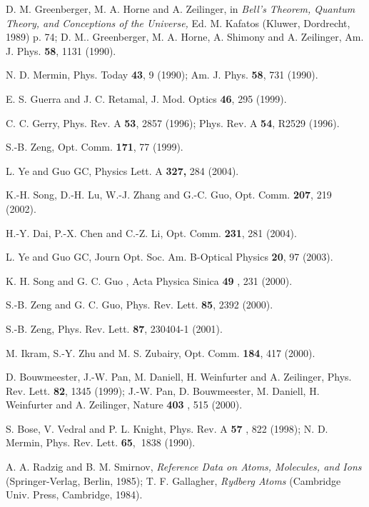 \documentclass[12pt,thmsa]{article}
\begin{document}
\begin{thebibliography}{99}
 D. M. Greenberger, M. A. Horne and A. Zeilinger, in \textit{%
Bell's Theorem, Quantum Theory, and Conceptions of the Universe, }Ed. M.
Kafatos (Kluwer, Dordrecht, 1989) p. 74; D. M.. Greenberger, M. A. Horne, A.
Shimony and A. Zeilinger, Am. J. Phys. \textbf{58}, 1131 (1990).

 N. D. Mermin, Phys. Today \textbf{43}, 9 (1990); Am. J.
Phys. \textbf{58}, 731 (1990).

 E. S. Guerra and J. C. Retamal, J. Mod. Optics \textbf{%
46}, 295 (1999).

 C. C. Gerry, Phys. Rev. A \textbf{53}, 2857 (1996); Phys.
Rev. A \textbf{54}, R2529 (1996).

 S.-B. Zeng, Opt. Comm. \textbf{171}, 77 (1999).

 L. Ye and Guo GC, Physics Lett. A \textbf{327,} 284 (2004).

 K.-H. Song, D.-H. Lu, W.-J. Zhang and G.-C. Guo,
Opt. Comm. \textbf{207}, 219 (2002).

 H.-Y. Dai, P.-X. Chen and C.-Z. Li, Opt. Comm. \textbf{%
231}, 281 (2004).

 L. Ye and Guo GC, Journ Opt. Soc. Am. B-Optical Physics 
\textbf{20}, 97 (2003).

 K. H. Song and G. C. Guo , Acta Physica Sinica \textbf{49}%
, 231 (2000).

 S.-B. Zeng and G. C. Guo, Phys. Rev. Lett. \textbf{85},
2392 (2000).

 S.-B. Zeng, Phys. Rev. Lett. \textbf{87}, 230404-1 (2001).

 M. Ikram, S.-Y. Zhu and M. S. Zubairy, Opt. Comm. 
\textbf{184}, 417 (2000).

 D. Bouwmeester, J.-W. Pan, M. Daniell, H. Weinfurter and A.
Zeilinger, Phys. Rev. Lett. \textbf{82}, 1345 (1999); J.-W. Pan, D.
Bouwmeester, M. Daniell, H. Weinfurter and A. Zeilinger, Nature \textbf{403}%
, 515 (2000).

 S. Bose, V. Vedral and P. L. Knight, Phys. Rev. A \textbf{57}%
, 822 (1998); N. D. Mermin, Phys. Rev. Lett. \textbf{65},\textbf{\ }1838
(1990).

 A. A. Radzig and B. M. Smirnov, \textit{Reference Data on
Atoms, Molecules, and Ions} (Springer-Verlag, Berlin, 1985); T. F.
Gallagher, \textit{Rydberg Atoms }(Cambridge Univ. Press, Cambridge, 1984).


\end{thebibliography}
\end{document}
